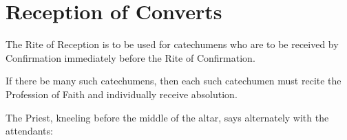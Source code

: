 \section{Reception of Converts}
\fancyhead[RE,LO]{}
\begin{rubric}
    The Rite of Reception is to be used for catechumens who are to be received by Confirmation immediately before the Rite of Confirmation.
\end{rubric}
\begin{rubric}
    If there be many such catechumens, then each such catechumen must recite the Profession of Faith and individually receive absolution.
\end{rubric}
\begin{rubric}
    The Priest, kneeling before the middle of the altar, says alternately with the attendants:
\end{rubric}
